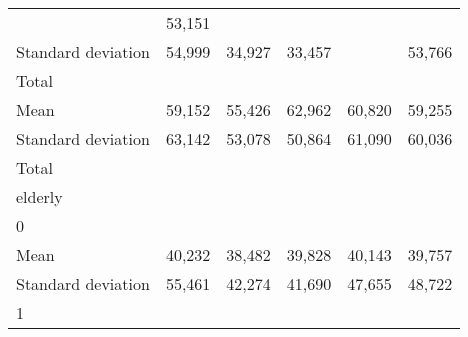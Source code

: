 \begin{tabular}{llllll}
  \multicolumn{1}{r}{} &
  \multicolumn{1}{r}{53,151} \\
\multicolumn{1}{l}{\hspace{4em}Standard deviation} &
  \multicolumn{1}{|r}{54,999} &
  \multicolumn{1}{r}{34,927} &
  \multicolumn{1}{r}{33,457} &
  \multicolumn{1}{r}{} &
  \multicolumn{1}{r}{53,766} \\
\multicolumn{1}{l}{\hspace{3em}Total} &
  \multicolumn{1}{|r}{} &
  \multicolumn{1}{r}{} &
  \multicolumn{1}{r}{} &
  \multicolumn{1}{r}{} &
  \multicolumn{1}{r}{} \\
\multicolumn{1}{l}{\hspace{4em}Mean} &
  \multicolumn{1}{|r}{59,152} &
  \multicolumn{1}{r}{55,426} &
  \multicolumn{1}{r}{62,962} &
  \multicolumn{1}{r}{60,820} &
  \multicolumn{1}{r}{59,255} \\
\multicolumn{1}{l}{\hspace{4em}Standard deviation} &
  \multicolumn{1}{|r}{63,142} &
  \multicolumn{1}{r}{53,078} &
  \multicolumn{1}{r}{50,864} &
  \multicolumn{1}{r}{61,090} &
  \multicolumn{1}{r}{60,036} \\
\multicolumn{1}{l}{\hspace{1em}Total} &
  \multicolumn{1}{|r}{} &
  \multicolumn{1}{r}{} &
  \multicolumn{1}{r}{} &
  \multicolumn{1}{r}{} &
  \multicolumn{1}{r}{} \\
\multicolumn{1}{l}{\hspace{2em}elderly} &
  \multicolumn{1}{|r}{} &
  \multicolumn{1}{r}{} &
  \multicolumn{1}{r}{} &
  \multicolumn{1}{r}{} &
  \multicolumn{1}{r}{} \\
\multicolumn{1}{l}{\hspace{3em}0} &
  \multicolumn{1}{|r}{} &
  \multicolumn{1}{r}{} &
  \multicolumn{1}{r}{} &
  \multicolumn{1}{r}{} &
  \multicolumn{1}{r}{} \\
\multicolumn{1}{l}{\hspace{4em}Mean} &
  \multicolumn{1}{|r}{40,232} &
  \multicolumn{1}{r}{38,482} &
  \multicolumn{1}{r}{39,828} &
  \multicolumn{1}{r}{40,143} &
  \multicolumn{1}{r}{39,757} \\
\multicolumn{1}{l}{\hspace{4em}Standard deviation} &
  \multicolumn{1}{|r}{55,461} &
  \multicolumn{1}{r}{42,274} &
  \multicolumn{1}{r}{41,690} &
  \multicolumn{1}{r}{47,655} &
  \multicolumn{1}{r}{48,722} \\
\multicolumn{1}{l}{\hspace{3em}1} &
  \multicolumn{1}{|r}{} &

\end{tabular}
